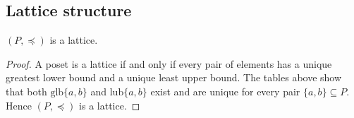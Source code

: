 \subsection{Lattice structure}

\begin{proposition}
$(P, \preceq)$ is a lattice.
\end{proposition}

\begin{proof}
A poset is a lattice if and only if every pair of elements has a unique greatest
lower bound and a unique least upper bound. The tables above show that both
$\mathrm{glb}\{a,b\}$ and $\mathrm{lub}\{a,b\}$ exist and are unique for every
pair $\{a,b\} \subseteq P$. Hence $(P, \preceq)$ is a lattice.
\end{proof}

